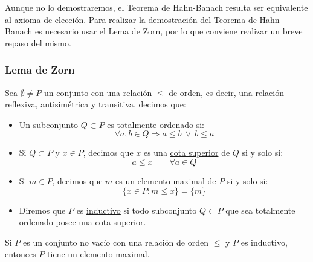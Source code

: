 \noindent
Aunque no lo demostraremos, el Teorema de Hahn-Banach resulta ser equivalente al axioma de elección. Para realizar la demostración del Teorema de Hahn-Banach es necesario usar el Lema de Zorn, por lo que conviene realizar un breve repaso del mismo. 

\subsubsection{Lema de Zorn}
\begin{definicion}
    Sea $\emptyset \neq P$ un conjunto con una relación $\leq$ de orden, es decir, una relación reflexiva, antisimétrica y transitiva, decimos que:
    \begin{itemize}
        \item Un subconjunto $Q\subset P$ es \underline{totalmente ordenado} si:
            \begin{equation*}
                \forall a,b\in Q \Longrightarrow a\leq b\ \lor\ b\leq a
            \end{equation*}
        \item Si $Q\subset P$ y $x\in P$, decimos que $x$ es una \underline{cota superior} de $Q$ si y solo si:
            \begin{equation*}
                a\leq x \qquad \forall a\in Q
            \end{equation*}
        \item Si $m\in P$, decimos que $m$ es un \underline{elemento maximal} de $P$ si y solo si:
            \begin{equation*}
                \{x\in P : m \leq x\} = \{m\}
            \end{equation*}
        \item Diremos que $P$ es \underline{inductivo} si todo subconjunto $Q\subset P$ que sea totalmente ordenado posee una cota superior.
    \end{itemize}
\end{definicion}

\begin{lema}[de Zorn]
    Si $P$ es un conjunto no vacío con una relación de orden $\leq$ y $P$  es inductivo, entonces $P$ tiene un elemento maximal.
\end{lema}


